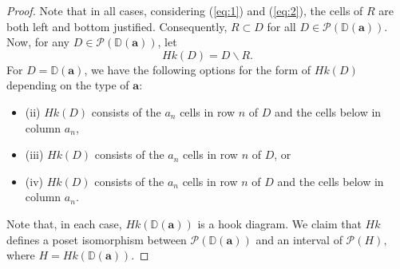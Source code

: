 \documentclass[letterpaper,10pt]{article}
\begin{document}
\begin{proof}
    \noindent
    Note that in all cases, considering (\ref{eq:1}) and (\ref{eq:2}), the cells of $R$ are both left and bottom justified. Consequently, $R\subset D$ for all $D\in \mathcal{P}(\mathbb{D}(\mathbf{a}))$. Now, for any $D\in \mathcal{P}(\mathbb{D}(\mathbf{a}))$, let $$Hk(D)=D\backslash R.$$ For $D=\mathbb{D}(\mathbf{a})$, we have the following options for the form of $Hk(D)$ depending on the type of $\mathbf{a}$:
    \begin{itemize}
        \item[] (ii) $Hk(D)$ consists of the $a_n$ cells in row $n$ of $D$ and the cells below in column $a_n$,
        \item[] (iii) $Hk(D)$ consists of the $a_n$ cells in row $n$ of $D$, or
        \item[] (iv) $Hk(D)$ consists of the $a_n$ cells in row $n$ of $D$ and the cells below in column $a_n$.
    \end{itemize}
    Note that, in each case, $Hk(\mathbb{D}(\mathbf{a}))$ is a hook diagram. We claim that $Hk$ defines a poset isomorphism between $\mathcal{P}(\mathbb{D}(\mathbf{a}))$ and an interval of $\mathcal{P}(H),$ where $H=Hk(\mathbb{D}(\mathbf{a}))$.


\end{proof}
\end{document}
